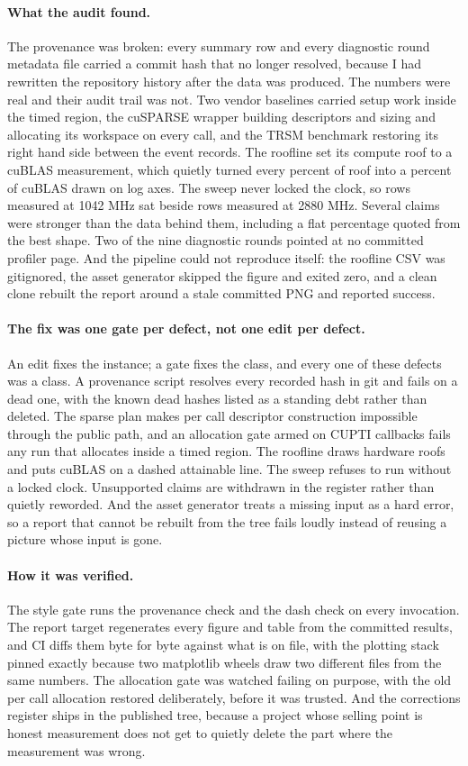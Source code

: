 \documentclass[11pt]{article}
\begin{document}
\paragraph{What the audit found.} The provenance was broken: every summary row and
every diagnostic round metadata file carried a commit hash that no longer resolved,
because I had rewritten the repository history after the data was produced. The
numbers were real and their audit trail was not. Two vendor baselines carried setup
work inside the timed region, the cuSPARSE wrapper building descriptors and sizing
and allocating its workspace on every call, and the TRSM benchmark restoring its
right hand side between the event records. The roofline set its compute roof to a
cuBLAS measurement, which quietly turned every percent of roof into a percent of
cuBLAS drawn on log axes. The sweep never locked the clock, so rows measured at
1042 MHz sat beside rows measured at 2880 MHz. Several claims were stronger than
the data behind them, including a flat percentage quoted from the best shape. Two
of the nine diagnostic rounds pointed at no committed profiler page. And the
pipeline could not reproduce itself: the roofline CSV was gitignored, the asset
generator skipped the figure and exited zero, and a clean clone rebuilt the report
around a stale committed PNG and reported success.

\paragraph{The fix was one gate per defect, not one edit per defect.} An edit fixes
the instance; a gate fixes the class, and every one of these defects was a class.
A provenance script resolves every recorded hash in git and fails on a dead one,
with the known dead hashes listed as a standing debt rather than deleted. The
sparse plan makes per call descriptor construction impossible through the public
path, and an allocation gate armed on CUPTI callbacks fails any run that allocates
inside a timed region. The roofline draws hardware roofs and puts cuBLAS on a
dashed attainable line. The sweep refuses to run without a locked clock.
Unsupported claims are withdrawn in the register rather than quietly reworded. And
the asset generator treats a missing input as a hard error, so a report that cannot
be rebuilt from the tree fails loudly instead of reusing a picture whose input is
gone.

\paragraph{How it was verified.} The style gate runs the provenance check and the
dash check on every invocation. The report target regenerates every figure and
table from the committed results, and CI diffs them byte for byte against what is
on file, with the plotting stack pinned exactly because two matplotlib wheels draw
two different files from the same numbers. The allocation gate was watched failing
on purpose, with the old per call allocation restored deliberately, before it was
trusted. And the corrections register ships in the published tree, because a
project whose selling point is honest measurement does not get to quietly delete
the part where the measurement was wrong.
\end{document}
